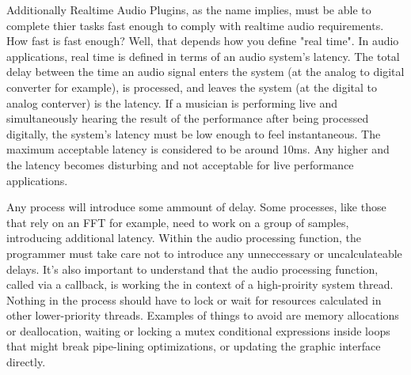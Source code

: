 Additionally Realtime Audio Plugins, as the name implies, must be able to complete thier tasks fast enough to comply with realtime audio requirements. How fast is fast enough? Well, that depends how you define "real time". In audio applications, real time is defined in terms of an audio system's latency. The total delay between the time an audio signal enters the system (at the analog to digital converter for example), is processed, and leaves the system (at the digital to analog conterver) is the latency. If a musician is performing live and simultaneously hearing the result of the performance after being processed digitally, the system's latency must be low enough to feel instantaneous. The maximum acceptable latency is considered to be around 10ms\cite{AES67-2013}. Any higher and the latency becomes disturbing and not acceptable for live performance applications.

Any process will introduce some ammount of delay. Some processes, like those that rely on an FFT for example, need to work on a group of samples, introducing additional latency. Within the audio processing function, the programmer must take care not to introduce any unneccessary or uncalculateable delays. It's also important to understand that the audio processing function, called via a callback, is working the in context of a high-proirity system thread. Nothing in the process should have to lock or wait for resources calculated in other lower-priority threads. Examples of things to avoid are memory allocations or deallocation, waiting or locking a mutex conditional expressions inside loops that might break pipe-lining optimizations\cite{realtime-architectures}, or updating the graphic interface directly.

